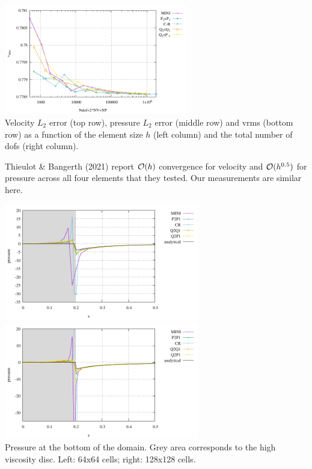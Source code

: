 \begin{center}
\includegraphics[width=8cm]{python_codes/fieldstone_112/results/exp5/vrms_ndof.pdf}\\
{\captionfont Velocity $L_2$ error (top row), pressure $L_2$ error (middle row) and vrms (bottom row) 
as a function of the element size $h$ (left column) and the total number of dofs (right column).}
\end{center}

Thieulot \& Bangerth (2021) \cite{thba22} report ${\cal O}(h)$ convergence for 
velocity and ${\cal O}(h^{0.5})$ for pressure across all four elements that they tested.
Our measurements are similar here.


\begin{center}
\includegraphics[width=8.5cm]{python_codes/fieldstone_112/results/exp5/bottom64}
\includegraphics[width=8.5cm]{python_codes/fieldstone_112/results/exp5/bottom128}\\
{\captionfont Pressure at the bottom of the domain. Grey area corresponds to the 
high viscosity disc. Left: 64x64 cells; right: 128x128 cells.}
\end{center}

